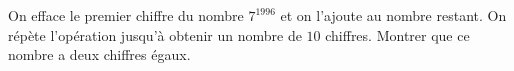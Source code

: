 On efface le premier chiffre du nombre $7^{1996}$ et on l'ajoute au nombre restant. On répète l'opération jusqu'à obtenir un nombre de $10$ chiffres. Montrer que ce nombre a deux chiffres égaux.
